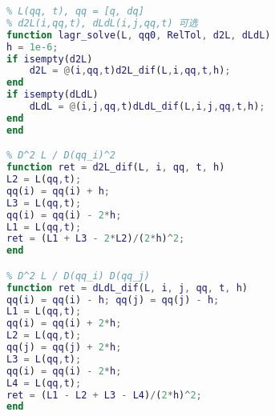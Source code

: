 \begin{lstlisting}[language=matlab, caption=lagr\_solve.m]
% 数值解拉格朗日方程
% L(qq, t), qq = [q, dq]
% d2L(i,qq,t), dLdL(i,j,qq,t) 可选
function lagr_solve(L, qq0, RelTol, d2L, dLdL)
h = 1e-6;
if isempty(d2L)
    d2L = @(i,qq,t)d2L_dif(L,i,qq,t,h);
end
if isempty(dLdL)
    dLdL = @(i,j,qq,t)dLdL_dif(L,i,j,qq,t,h);
end
end

% D^2 L / D(qq_i)^2
function ret = d2L_dif(L, i, qq, t, h)
L2 = L(qq,t);
qq(i) = qq(i) + h;
L3 = L(qq,t);
qq(i) = qq(i) - 2*h;
L1 = L(qq,t);
ret = (L1 + L3 - 2*L2)/(2*h)^2;
end

% D^2 L / D(qq_i) D(qq_j)
function ret = dLdL_dif(L, i, j, qq, t, h)
qq(i) = qq(i) - h; qq(j) = qq(j) - h;
L1 = L(qq,t);
qq(i) = qq(i) + 2*h;
L2 = L(qq,t);
qq(j) = qq(j) + 2*h;
L3 = L(qq,t);
qq(i) = qq(i) - 2*h;
L4 = L(qq,t);
ret = (L1 - L2 + L3 - L4)/(2*h)^2;
end
\end{lstlisting}
